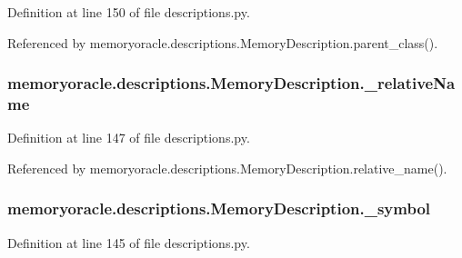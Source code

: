 Definition at line 150 of file descriptions.\+py.



Referenced by memoryoracle.\+descriptions.\+Memory\+Description.\+parent\+\_\+class().

\hypertarget{classmemoryoracle_1_1descriptions_1_1MemoryDescription_aabeba1644723470428b1aeb30a20e554}{}
\subsubsection[{\+\_\+relative\+Name}]{\setlength{\rightskip}{0pt plus 5cm}memoryoracle.\+descriptions.\+Memory\+Description.\+\_\+relative\+Name\hspace{0.3cm}{\ttfamily [private]}}\label{classmemoryoracle_1_1descriptions_1_1MemoryDescription_aabeba1644723470428b1aeb30a20e554}


Definition at line 147 of file descriptions.\+py.



Referenced by memoryoracle.\+descriptions.\+Memory\+Description.\+relative\+\_\+name().

\hypertarget{classmemoryoracle_1_1descriptions_1_1MemoryDescription_a6857ccb0a28dc478c8da23457b55f7d7}{}
\subsubsection[{\+\_\+symbol}]{\setlength{\rightskip}{0pt plus 5cm}memoryoracle.\+descriptions.\+Memory\+Description.\+\_\+symbol\hspace{0.3cm}{\ttfamily [private]}}\label{classmemoryoracle_1_1descriptions_1_1MemoryDescription_a6857ccb0a28dc478c8da23457b55f7d7}


Definition at line 145 of file descriptions.\+py.

\hypertarget{classmemoryoracle_1_1descriptions_1_1MemoryDescription_a340a0f8c90bf3c2d80323327d706ee1b}{}
